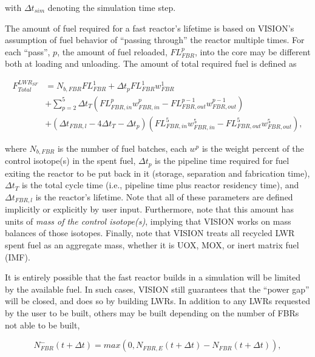 with $\Delta t_{sim}$ denoting the simulation time step.

The amount of fuel required for a fast reactor's lifetime is based on VISION's
assumption of fuel behavior of ``passing through'' the reactor multiple
times. For each ``pass'', $p$, the amount of fuel reloaded, $FL^p_{FBR}$, into
the core may be different both at loading and unloading. The amount of total
required fuel is defined as

\begin{equation}
\begin{aligned}
F^{LWR_{SF}}_{Total} & = N_{b,FBR} FL^1_{FBR} + \Delta t_p FL^1_{FBR} w^1_{FBR} \\
                   & + \sum_{p=2}^{5} \Delta t_T (FL^p_{FBR,in} w^p_{FBR,in} - FL^{p-1}_{FBR,out} w^{p-1}_{FBR,out}) \\
                   & + (\Delta t_{FBR,l} - 4 \Delta t_T - \Delta t_p) (FL^5_{FBR,in} w^5_{FBR,in} - FL^{5}_{FBR,out} w^{5}_{FBR,out}),
\end{aligned}
\end{equation}

where $N_{b,FBR}$ is the number of fuel batches, each $w^p$ is the weight
percent of the control isotope(s) in the spent fuel, $\Delta t_p$ is the
pipeline time required for fuel exiting the reactor to be put back in it
(storage, separation and fabrication time), $\Delta t_T$ is the total cycle time
(i.e., pipeline time plus reactor residency time), and $\Delta t_{FBR,l}$ is the
reactor's lifetime. Note that all of these parameters are defined implicitly or
explicitly by user input. Furthermore, note that this amount has units
of \textit{mass of the control isotope(s)}, implying that VISION works on mass
balances of those isotopes. Finally, note that VISION treats all recycled LWR
spent fuel as an aggregate mass, whether it is UOX, MOX, or inert matrix fuel
(IMF).

It is entirely possible that the fast reactor builds in a simulation will be
limited by the available fuel. In such cases, VISION still guarantees that the
``power gap'' will be closed, and does so by building LWRs. In addition to any
LWRs requested by the user to be built, others may be built depending on the
number of FBRs not able to be built,

\begin{equation}
N^-_{FBR}\left(t+\Delta t\right) = 
                        max(0,N_{FBR,E}\left(t+\Delta t\right) - 
                        N_{FBR}\left(t+\Delta t\right)),
\end{equation}

